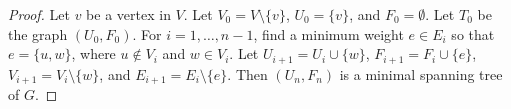         \begin{proof}
            Let $v$ be a vertex in $V$.
            Let $V_{0}=V\setminus\{v\}$,
            $U_{0}=\{v\}$, and $F_{0}=\emptyset$.
            Let $T_{0}$ be the graph $(U_{0},F_{0})$.
            For $i=1,\hdots,n-1$, find a minimum weight
            $e\in{E_{i}}$ so that $e=\{u,w\}$, where
            $u\notin{V_{i}}$ and $w\in{V_{i}}$.
            Let $U_{i+1}=U_{i}\cup\{w\}$,
            $F_{i+1}=F_{i}\cup\{e\}$,
            $V_{i+1}=V_{i}\setminus\{w\}$, and
            $E_{i+1}=E_{i}\setminus\{e\}$.
            Then $(U_{n},F_{n})$ is a minimal spanning tree of
            $G$.
        \end{proof}